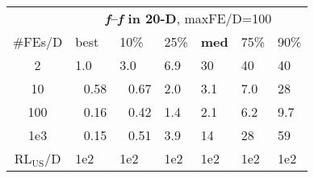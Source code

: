 \begin{tabular}{c|llllll}
 & \multicolumn{6}{|c}{\textbf{\textit{f}\raisebox{-0.35ex}{1}--\textit{f}\raisebox{-0.35ex}{24} in 20-D}, maxFE/D=100}\\
\#FEs/D & best & 10\% & 25\% & \textbf{med} & 75\% & 90\%\\
2 & \hspace*{1ex}1.0 & \hspace*{1ex}3.0 & \hspace*{1ex}6.9 & 30 & 40 & 40\\
10 & ~\,0.58 & ~\,0.67 & \hspace*{1ex}2.0 & \hspace*{1ex}3.1 & \hspace*{1ex}7.0 & 28\\
100 & ~\,0.16 & ~\,0.42 & \hspace*{1ex}1.4 & \hspace*{1ex}2.1 & \hspace*{1ex}6.2 & \hspace*{1ex}9.7\\
1e3 & ~\,0.15 & ~\,0.51 & \hspace*{1ex}3.9 & 14 & 28 & 59\\
$\text{RL}_{\text{US}}$/D & 1e2 & 1e2 & 1e2 & 1e2 & 1e2 & 1e2
\end{tabular}
